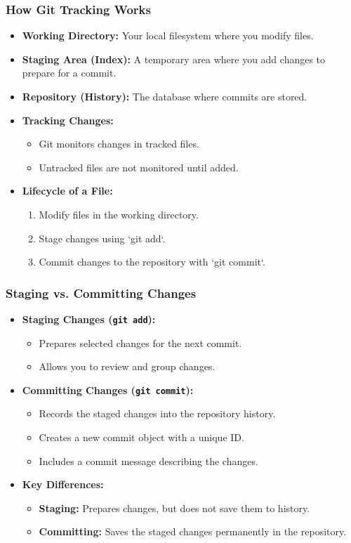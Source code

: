 \begin{frame}
	\frametitle{How Git Tracking Works}
	\begin{itemize}
		\item \textbf{Working Directory:} Your local filesystem where you modify files.
		\item \textbf{Staging Area (Index):} A temporary area where you add changes to prepare for a commit.
		\item \textbf{Repository (History):} The database where commits are stored.
		\item \textbf{Tracking Changes:}
		\begin{itemize}
			\item Git monitors changes in tracked files.
			\item Untracked files are not monitored until added.
		\end{itemize}
		\item \textbf{Lifecycle of a File:}
		\begin{enumerate}
			\item Modify files in the working directory.
			\item Stage changes using `git add`.
			\item Commit changes to the repository with `git commit`.
		\end{enumerate}
	\end{itemize}
\end{frame}

\begin{frame}
	\frametitle{Staging vs. Committing Changes}
	\begin{itemize}
		\item \textbf{Staging Changes (\texttt{git add}):}
		\begin{itemize}
			\item Prepares selected changes for the next commit.
			\item Allows you to review and group changes.
		\end{itemize}
		\item \textbf{Committing Changes (\texttt{git commit}):}
		\begin{itemize}
			\item Records the staged changes into the repository history.
			\item Creates a new commit object with a unique ID.
			\item Includes a commit message describing the changes.
		\end{itemize}
		\item \textbf{Key Differences:}
		\begin{itemize}
			\item \textbf{Staging:} Prepares changes, but does not save them to history.
			\item \textbf{Committing:} Saves the staged changes permanently in the repository.
		\end{itemize}
	\end{itemize}
\end{frame}

